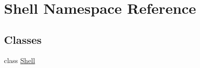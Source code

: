 \hypertarget{namespaceShell}{\section{Shell Namespace Reference}
\label{namespaceShell}
}
\subsection*{Classes}
\begin{DoxyCompactItemize}
\item 
class \hyperlink{classShell_1_1Shell}{Shell}
\end{DoxyCompactItemize}
